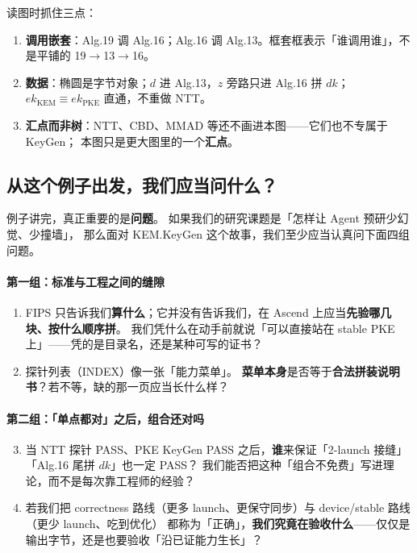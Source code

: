 \documentclass[UTF8,a4paper,11pt]{ctexart}
\theoremstyle{definition}
\theoremstyle{plain}
\theoremstyle{remark}
\numberwithin{figure}{section}
\numberwithin{table}{section}
\begin{document}
读图时抓住三点：
\begin{enumerate}
  \item \textbf{调用嵌套}：Alg.19 调 Alg.16；Alg.16 调 Alg.13。框套框表示「谁调用谁」，不是平铺的 19$\to$13$\to$16。
  \item \textbf{数据}：椭圆是字节对象；$d$ 进 Alg.13，$z$ 旁路只进 Alg.16 拼 $\mathit{dk}$；
        $\mathit{ek}_{\mathrm{KEM}}{\equiv}\mathit{ek}_{\mathrm{PKE}}$ 直通，不重做 NTT。
  \item \textbf{汇点而非树}：NTT、CBD、MMAD 等还不画进本图——它们也不专属于 KeyGen；
        本图只是更大图里的一个\textbf{汇点}。
\end{enumerate}

\subsection{从这个例子出发，我们应当问什么？}

例子讲完，真正重要的是\textbf{问题}。
如果我们的研究课题是「怎样让 Agent 预研少幻觉、少撞墙」，
那么面对 KEM.KeyGen 这个故事，我们至少应当认真问下面四组问题。

\paragraph{第一组：标准与工程之间的缝隙}
\begin{enumerate}
  \item FIPS 只告诉我们\textbf{算什么}；它并没有告诉我们，在 Ascend 上应当\textbf{先验哪几块、按什么顺序拼}。
        我们凭什么在动手前就说「可以直接站在 stable PKE 上」——凭的是目录名，还是某种可写的证书？
  \item 探针列表（INDEX）像一张「能力菜单」。
        \textbf{菜单本身}是否等于\textbf{合法拼装说明书}？若不等，缺的那一页应当长什么样？
\end{enumerate}

\paragraph{第二组：「单点都对」之后，组合还对吗}
\begin{enumerate}
  \setcounter{enumi}{2}
  \item 当 NTT 探针 PASS、PKE KeyGen PASS 之后，\textbf{谁}来保证「2-launch 接缝」「Alg.16 尾拼 $\mathit{dk}$」也一定 PASS？
        我们能否把这种「组合不免费」写进理论，而不是每次靠工程师的经验？
  \item 若我们把 correctness 路线（更多 launch、更保守同步）与 device/stable 路线（更少 launch、吃到优化）
        都称为「正确」，\textbf{我们究竟在验收什么}——仅仅是输出字节，还是也要验收「沿已证能力生长」？
\end{enumerate}
\end{document}
